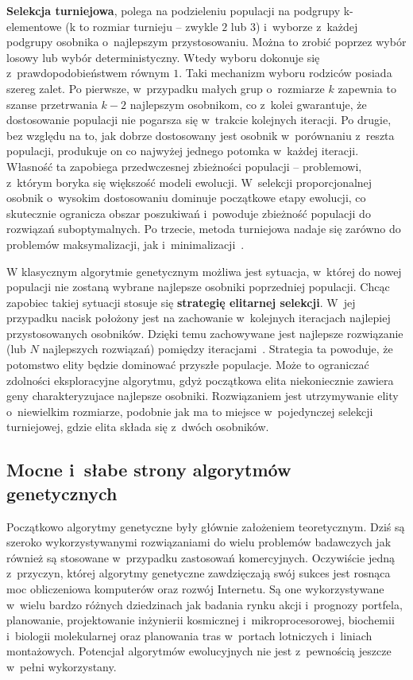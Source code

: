 \documentclass[twoside,12pt]{report}
\begin{document}
\textbf{Selekcja turniejowa}, polega na podzieleniu populacji na podgrupy k-elementowe (k to rozmiar turnieju – zwykle $2$ lub $3$) i~wyborze z~każdej podgrupy osobnika o~najlepszym przystosowaniu. Można to zrobić poprzez wybór losowy lub wybór deterministyczny. Wtedy wyboru dokonuje się z~prawdopodobieństwem równym $1$. Taki mechanizm wyboru rodziców posiada szereg zalet. Po pierwsze, w~przypadku małych grup o~rozmiarze $k$ zapewnia to szanse przetrwania $k-2$ najlepszym osobnikom, co z~kolei gwarantuje, że dostosowanie populacji nie pogarsza się w~trakcie kolejnych iteracji. Po drugie, bez względu na to, jak dobrze dostosowany jest osobnik w~porównaniu z~reszta populacji, produkuje on co najwyżej jednego potomka w~każdej iteracji. Własność ta zapobiega przedwczesnej zbieżności populacji – problemowi, z~którym boryka się większość modeli ewolucji. W~selekcji proporcjonalnej osobnik o~wysokim dostosowaniu dominuje początkowe etapy ewolucji, co skutecznie ogranicza obszar poszukiwań i~powoduje zbieżność populacji do rozwiązań suboptymalnych. Po trzecie, metoda turniejowa nadaje się zarówno do problemów maksymalizacji, jak i~minimalizacji~\cite{genetyczne-immunologiczne}. 

W klasycznym algorytmie genetycznym możliwa jest sytuacja, w~której do nowej populacji nie zostaną wybrane najlepsze osobniki poprzedniej populacji. Chcąc zapobiec takiej sytuacji stosuje się \textbf{strategię elitarnej selekcji}. W~jej przypadku nacisk położony jest na zachowanie w~kolejnych iteracjach najlepiej przystosowanych osobników. Dzięki temu zachowywane jest najlepsze rozwiązanie (lub $N$ najlepszych rozwiązań) pomiędzy iteracjami~\cite{genetyczne-dane=ewo}. Strategia ta powoduje, że potomstwo elity będzie dominować przyszłe populacje. Może to ograniczać zdolności eksploracyjne algorytmu, gdyż początkowa elita niekoniecznie zawiera geny charakteryzujace najlepsze osobniki. Rozwiązaniem jest utrzymywanie elity o~niewielkim rozmiarze, podobnie jak ma to miejsce w~pojedynczej selekcji turniejowej, gdzie elita składa się z~dwóch osobników.

\subsection{Mocne i~słabe strony algorytmów genetycznych}
Początkowo algorytmy genetyczne były głównie założeniem teoretycznym. Dziś są szeroko wykorzystywanymi rozwiązaniami do wielu problemów badawczych jak również są stosowane w~przypadku zastosowań komercyjnych. Oczywiście jedną z~przyczyn, której algorytmy genetyczne zawdzięczają swój sukces jest rosnąca moc obliczeniowa komputerów oraz rozwój Internetu. Są one wykorzystywane w~wielu bardzo różnych dziedzinach jak badania rynku akcji i~prognozy portfela, planowanie, projektowanie inżynierii kosmicznej i~mikroprocesorowej, biochemii i~biologii molekularnej oraz planowania tras w~portach lotniczych i~liniach montażowych. Potencjał algorytmów ewolucyjnych nie jest z~pewnością jeszcze w~pełni wykorzystany.
\end{document}
